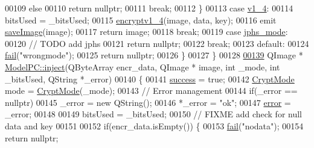 \begin{DoxyCode}
00109             \textcolor{keywordflow}{else}
00110                 \textcolor{keywordflow}{return} \textcolor{keyword}{nullptr};
00111             \textcolor{keywordflow}{break};
00112         \}
00113         \textcolor{keywordflow}{case} \hyperlink{class_model_p_c_a296dd7afe3e1c49b3da25fd644fe4ceba43138df6b33a6b2bf608768907f95abc}{v1\_4}:
00114             bitsUsed = \_bitsUsed;
00115             \hyperlink{class_model_p_c_a4daefc3fb87a1f19172b9b20c987eb12}{encryptv1\_4}(image, data, key);
00116             emit \hyperlink{class_model_p_c_a41f5e2e8022679046e4d3fa1109025fa}{saveImage}(image);
00117             \textcolor{keywordflow}{return} image;
00118         \textcolor{keywordflow}{break};
00119         \textcolor{keywordflow}{case} \hyperlink{class_model_p_c_a296dd7afe3e1c49b3da25fd644fe4ceba90ca32d3ccbb6be224cdfc33f7096eea}{jphs\_mode}:
00120             \textcolor{comment}{// TODO add jphs}
00121             \textcolor{keywordflow}{return} \textcolor{keyword}{nullptr};
00122         \textcolor{keywordflow}{break};
00123         \textcolor{keywordflow}{default}:
00124             \hyperlink{class_model_p_c_a47464b59b7e37fcee25e55475708aabd}{fail}(\textcolor{stringliteral}{"wrongmode"});
00125             \textcolor{keywordflow}{return} \textcolor{keyword}{nullptr};
00126     \}
00127 \}
00128 
\hypertarget{modelpc_8cpp_source.tex_l00139}{}\hyperlink{class_model_p_c_aada6a04d81ada8f2b4ba18108c8d6f10}{00139} QImage * \hyperlink{class_model_p_c_aada6a04d81ada8f2b4ba18108c8d6f10}{ModelPC::inject}(QByteArray encr\_data, QImage * image, \textcolor{keywordtype}{int} \_mode, \textcolor{keywordtype}{int} \_bitsUsed, 
      QString *\_error)
00140 \{
00141     \hyperlink{class_model_p_c_a945ffbbc44a832b953c191debd448f4c}{success} = \textcolor{keyword}{true};
00142     \hyperlink{class_model_p_c_a296dd7afe3e1c49b3da25fd644fe4ceb}{CryptMode} mode = \hyperlink{class_model_p_c_a296dd7afe3e1c49b3da25fd644fe4ceb}{CryptMode}(\_mode);
00143     \textcolor{comment}{// Error management}
00144     \textcolor{keywordflow}{if}(\_error == \textcolor{keyword}{nullptr})
00145         \_error = \textcolor{keyword}{new} QString();
00146     *\_error = \textcolor{stringliteral}{"ok"};
00147     \hyperlink{class_model_p_c_a4e5a9c0ca1f06fe5bc478b6bf248c37c}{error} = \_error;
00148 
00149     bitsUsed = \_bitsUsed;
00150     \textcolor{comment}{// FIXME add check for null data and key}
00151 
00152     \textcolor{keywordflow}{if}(encr\_data.isEmpty()) \{
00153         \hyperlink{class_model_p_c_a47464b59b7e37fcee25e55475708aabd}{fail}(\textcolor{stringliteral}{"nodata"});
00154         \textcolor{keywordflow}{return} \textcolor{keyword}{nullptr};

\end{DoxyCode}
